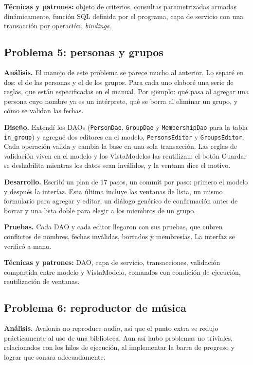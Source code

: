 \documentclass{article}
\begin{document}
\textbf{Técnicas y patrones:} objeto de criterios, consultas parametrizadas
armadas dinámicamente, función SQL definida por el programa, capa de servicio
con una transacción por operación, \emph{bindings}.

\subsection{Problema 5: personas y grupos}

\textbf{Análisis.} El manejo de este problema se parece mucho al anterior.
Lo separé en dos: el de las personas y el de los grupos. Para cada uno
elaboré una serie de reglas, que están especificadas en el manual. Por
ejemplo: qué pasa al agregar una persona cuyo nombre ya es un intérprete, qué
se borra al eliminar un grupo, y cómo se validan las fechas.

\textbf{Diseño.} Extendí los DAOs (\texttt{PersonDao}, \texttt{GroupDao} y
\texttt{MembershipDao} para la tabla \texttt{in\_group}) y agregué dos
editores en el modelo, \texttt{PersonsEditor} y \texttt{GroupsEditor}. Cada
operación valida y cambia la base en una sola transacción. Las reglas de
validación viven en el modelo y los VistaModelos las reutilizan: el botón
Guardar se deshabilita mientras los datos sean inválidos, y la ventana dice
el motivo.

\textbf{Desarrollo.} Escribí un plan de 17 pasos, un commit por paso:
primero el modelo y después la interfaz. Esta última incluye las ventanas de
lista, un mismo formulario para agregar y editar, un diálogo genérico de
confirmación antes de borrar y una lista doble para elegir a los miembros de
un grupo.

\textbf{Pruebas.} Cada DAO y cada editor llegaron con sus pruebas, que
cubren conflictos de nombres, fechas inválidas, borrados y membresías. La
interfaz se verificó a mano.

\textbf{Técnicas y patrones:} DAO, capa de servicio, transacciones,
validación compartida entre modelo y VistaModelo, comandos con condición de
ejecución, reutilización de ventanas.

\subsection{Problema 6: reproductor de música}

\textbf{Análisis.} Avalonia no reproduce audio, así que el punto extra se
redujo prácticamente al uso de una biblioteca. Aun así hubo problemas no
triviales, relacionados con los hilos de ejecución, al implementar la barra
de progreso y lograr que sonara adecuadamente.
\end{document}
